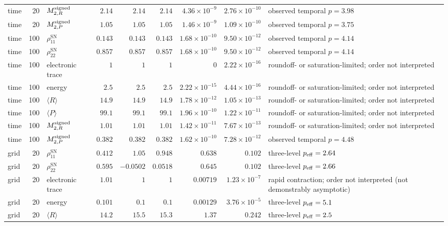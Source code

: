 \begin{landscape}
\begin{longtable}{l r l r r r r r L{0.18\textwidth}}
time & 20 & $M^{\rm signed}_{2,R}$ & $2.14$ & $2.14$ & $2.14$ & $4.36\times10^{-9}$ & $2.76\times10^{-10}$ & observed temporal $p=3.98$ \\
time & 20 & $M^{\rm signed}_{2,P}$ & $1.05$ & $1.05$ & $1.05$ & $1.46\times10^{-9}$ & $1.09\times10^{-10}$ & observed temporal $p=3.75$ \\
time & 100 & $\rho_{11}^{\mathrm{SN}}$ & $0.143$ & $0.143$ & $0.143$ & $1.68\times10^{-10}$ & $9.50\times10^{-12}$ & observed temporal $p=4.14$ \\
time & 100 & $\rho_{22}^{\mathrm{SN}}$ & $0.857$ & $0.857$ & $0.857$ & $1.68\times10^{-10}$ & $9.50\times10^{-12}$ & observed temporal $p=4.14$ \\
time & 100 & electronic trace & $1$ & $1$ & $1$ & $0$ & $2.22\times10^{-16}$ & roundoff- or saturation-limited; order not interpreted \\
time & 100 & energy & $2.5$ & $2.5$ & $2.5$ & $2.22\times10^{-15}$ & $4.44\times10^{-16}$ & roundoff- or saturation-limited; order not interpreted \\
time & 100 & $\langle R\rangle$ & $14.9$ & $14.9$ & $14.9$ & $1.78\times10^{-12}$ & $1.05\times10^{-13}$ & roundoff- or saturation-limited; order not interpreted \\
time & 100 & $\langle P\rangle$ & $99.1$ & $99.1$ & $99.1$ & $1.96\times10^{-10}$ & $1.22\times10^{-11}$ & roundoff- or saturation-limited; order not interpreted \\
time & 100 & $M^{\rm signed}_{2,R}$ & $1.01$ & $1.01$ & $1.01$ & $1.42\times10^{-11}$ & $7.67\times10^{-13}$ & roundoff- or saturation-limited; order not interpreted \\
time & 100 & $M^{\rm signed}_{2,P}$ & $0.382$ & $0.382$ & $0.382$ & $1.62\times10^{-10}$ & $7.28\times10^{-12}$ & observed temporal $p=4.48$ \\
grid & 20 & $\rho_{11}^{\mathrm{SN}}$ & $0.412$ & $1.05$ & $0.948$ & $0.638$ & $0.102$ & three-level $p_{\rm eff}=2.64$ \\
grid & 20 & $\rho_{22}^{\mathrm{SN}}$ & $0.595$ & $-0.0502$ & $0.0518$ & $0.645$ & $0.102$ & three-level $p_{\rm eff}=2.66$ \\
grid & 20 & electronic trace & $1.01$ & $1$ & $1$ & $0.00719$ & $1.23\times10^{-7}$ & rapid contraction; order not interpreted (not demonstrably asymptotic) \\
grid & 20 & energy & $0.101$ & $0.1$ & $0.1$ & $0.00129$ & $3.76\times10^{-5}$ & three-level $p_{\rm eff}=5.1$ \\
grid & 20 & $\langle R\rangle$ & $14.2$ & $15.5$ & $15.3$ & $1.37$ & $0.242$ & three-level $p_{\rm eff}=2.5$ \\

\end{longtable}
\end{landscape}
